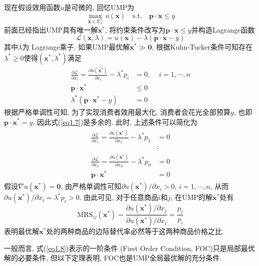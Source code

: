 \documentclass[cn, 12pt, math=mtpro2, bibstyle=apa, blue]{elegantbook}
\newcommand{\R}{\mathbb{R}}
\newcommand{\p}{\mathbf{p}}
\newcommand{\x}{\mathbf{x}}
\begin{document}
现在假设效用函数$u$是可微的, 回忆UMP为
\begin{equation}\label{eq1.4}
  \max_{\x\in\R^n_+} u(\x)\quad \text{s.t.}\quad \p\cdot\x\leq y
\end{equation}
前面已经指出UMP具有唯一解$\x^\ast$, 将约束条件改写为$\p\cdot\x\leq y$并构造Lagrange函数
$$\mathcal{L}(\x,\lambda)=u(\x)-\lambda(\p\cdot\x-y)$$
其中$\lambda$为 Lagrange乘子. 如果UMP最优解$\x^\ast\gg\mathbf{0}$, 根据Kuhn-Tucker条件可知存在$\lambda^\ast\ge0$使得$(\x^\ast,\lambda^\ast)$满足
\begin{align}
\frac{\partial\mathcal{L}}{\partial x_i}=\frac{\partial u(\x^\ast)}{\partial x_i}-\lambda^\ast p_i&=0,\,\quad i=1,\cdots, n \label{eq1.5} \\
\p\cdot\x^\ast&\leq 0  \label{eq1.6} \\
\lambda^\ast(\p\cdot\x^\ast-y)&=0 \label{eq1.7}
\end{align}
根据严格单调性可知, 为了实现消费者效用最大化, 消费者会花光全部预算$y$, 也即$\p\cdot\x^\ast=y$, 因此式(\ref{eq1.7})是多余的. 此时, 上述条件可以简化为
\begin{align}
\begin{split}
\frac{\partial\mathcal{L}}{\partial x_1}=\frac{\partial u(\x^\ast)}{\partial x_1}-\lambda^\ast p_1&=0  \\
&\vdots  \\
\frac{\partial\mathcal{L}}{\partial x_n}=\frac{\partial u(\x^\ast)}{\partial x_n}-\lambda^\ast p_n&=0 \\
\p\cdot\x^\ast&=0
\end{split}
\label{eq1.8}
\end{align}
假设$\nabla u(\x^\ast)=\mathbf{0}$, 由严格单调性可知$\partial u(\x^\ast)/\partial x_i>0$, $i=1,\cdots,n$, 从而$\partial u(\x^\ast)/\partial x_i=\lambda^\ast p_i>0$. 由此可见, 对于任意商品$i$和$j$, 在UMP的解$\x^\ast$处有
\begin{equation}\label{eq1.9}
  \text{MRS}_{ij}(\x^\ast)=\frac{\partial u(\x^\ast)/\partial x_j}{\partial u(\x^\ast)/\partial x_i}=\frac{p_j}{p_i}
\end{equation}
表明最优解$\x^\ast$处的两种商品的边际替代率必然等于这两种商品价格之比.

一般而言, 式(\ref{eq1.8})表示的一阶条件 (First Order Condition, FOC)只是局部最优解的必要条件, 但以下定理表明, FOC也是UMP全局最优解的充分条件.
\end{document}
